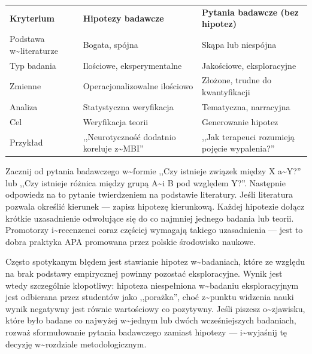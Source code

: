 \documentclass[12pt,a4paper,twoside,openany]{book}
\begin{document}
\begin{table}[H]
\centering
\begin{tabularx}{\textwidth}{X X X}
\toprule
 \textbf{Kryterium} & \textbf{Hipotezy badawcze} & \textbf{Pytania badawcze (bez hipotez)} \\
Podstawa w\textasciitilde{}literaturze & Bogata, spójna & Skąpa lub niespójna \\
Typ badania & Ilościowe, eksperymentalne & Jakościowe, eksploracyjne \\
Zmienne & Operacjonalizowalne ilościowo & Złożone, trudne do kwantyfikacji \\
Analiza & Statystyczna weryfikacja & Tematyczna, narracyjna \\
Cel & Weryfikacja teorii & Generowanie hipotez \\
Przykład & ,,Neurotyczność dodatnio koreluje z\textasciitilde{}MBI'' & ,,Jak terapeuci rozumieją pojęcie wypalenia?'' \\
\bottomrule
\end{tabularx}
\end{table}


\begin{tipbox} Zacznij od pytania badawczego w\textasciitilde{}formie ,,Czy istnieje związek między X a\textasciitilde{}Y?'' lub ,,Czy istnieje różnica między grupą A\textasciitilde{}i B pod względem Y?''. Następnie odpowiedz na to pytanie twierdzeniem na podstawie literatury. Jeśli literatura pozwala określić kierunek --- zapisz hipotezę kierunkową. Każdej hipotezie dołącz krótkie uzasadnienie odwołujące się do co najmniej jednego badania lub teorii. Promotorzy i\textasciitilde{}recenzenci coraz częściej wymagają takiego uzasadnienia --- jest to dobra praktyka APA promowana przez polskie środowisko naukowe.
\end{tipbox}


Często spotykanym błędem jest stawianie hipotez w\textasciitilde{}badaniach, które ze względu na brak podstawy empirycznej powinny pozostać eksploracyjne. Wynik jest wtedy szczególnie kłopotliwy: hipoteza niespełniona w\textasciitilde{}badaniu eksploracyjnym jest odbierana przez studentów jako ,,porażka'', choć z\textasciitilde{}punktu widzenia nauki wynik negatywny jest równie wartościowy co pozytywny. Jeśli piszesz o\textasciitilde{}zjawisku, które było badane co najwyżej w\textasciitilde{}jednym lub dwóch wcześniejszych badaniach, rozważ sformułowanie pytania badawczego zamiast hipotezy --- i\textasciitilde{}wyjaśnij tę decyzję w\textasciitilde{}rozdziale metodologicznym.
\end{document}

